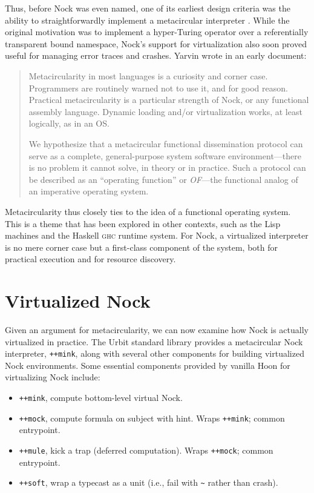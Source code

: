 \documentclass[twoside]{article}
\begin{document}
Thus, before Nock was even named, one of its earliest design criteria was the ability to straightforwardly implement a metacircular interpreter \citep{Yarvin2006,Yarvin2010}.  While the original motivation was to implement a hyper-Turing operator over a referentially transparent bound namespace, Nock's support for virtualization also soon proved useful for managing error traces and crashes.
Yarvin wrote in an early document:

\begin{quote}
Metacircularity in most languages is a curiosity and corner case.  Programmers are routinely warned not to use it, and for good reason.  Practical metacircularity is a particular strength of Nock, or any functional assembly language.  Dynamic loading and/or virtualization works, at least logically, as in an OS.

We hypothesize that a metacircular functional dissemination protocol can serve as a complete, general-purpose system software environment—there is no problem it cannot solve, in theory or in practice.  Such a protocol can be described as an ``operating function'' or \emph{OF}—the functional analog of an imperative operating system.  \citep{Yarvin2010a}
\end{quote}

\noindent
Metacircularity thus closely ties to the idea of a functional operating system.  This is a theme that has been explored in other contexts, such as the Lisp machines and the Haskell \textsc{ghc} runtime system.  For Nock, a virtualized interpreter is no mere corner case but a first-class component of the system, both for practical execution and for resource discovery.


\section{Virtualized Nock}

Given an argument for metacircularity, we can now examine how Nock is actually virtualized in practice.  The Urbit standard library provides a metacircular Nock interpreter, \lstinline[style=inlinecode]{++mink}, along with several other components for building virtualized Nock environments.  Some essential components provided by vanilla Hoon for virtualizing Nock include:

\begin{itemize}
  \item  \lstinline[style=inlinecode]{++mink}, compute bottom-level virtual Nock.
  \item  \lstinline[style=inlinecode]{++mock}, compute formula on subject with hint.  Wraps \lstinline[style=inlinecode]{++mink}; common entrypoint.
  \item  \lstinline[style=inlinecode]{++mule}, kick a trap (deferred computation).  Wraps \lstinline[style=inlinecode]{++mock}; common entrypoint.
  \item  \lstinline[style=inlinecode]{++soft}, wrap a typecast as a unit (i.e., fail with \lstinline[style=inlinecode]{~} rather than crash).
\end{itemize}
\end{document}
